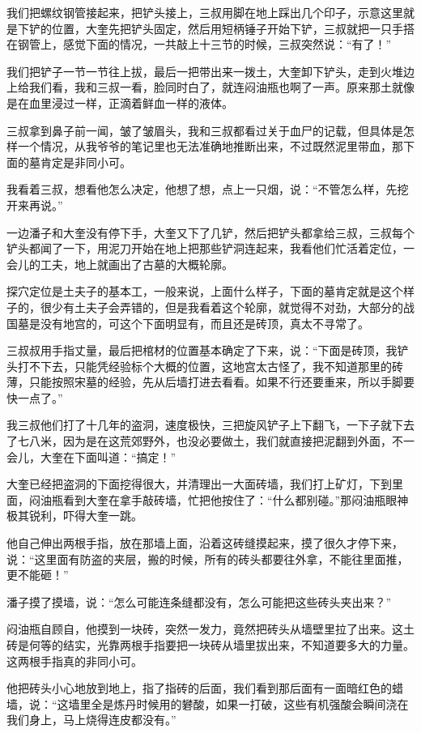 我们把螺纹钢管接起来，把铲头接上，三叔用脚在地上踩出几个印子，示意这里就是下铲的位置，大奎先把铲头固定，然后用短柄锤子开始下铲，三叔就把一只手搭在钢管上，感觉下面的情况，一共敲上十三节的时候，三叔突然说：“有了！”

我们把铲子一节一节往上拔，最后一把带出来一拨土，大奎卸下铲头，走到火堆边上给我们看，我和三叔一看，脸同时白了，就连闷油瓶也啊了一声。原来那土就像是在血里浸过一样，正滴着鲜血一样的液体。

三叔拿到鼻子前一闻，皱了皱眉头，我和三叔都看过关于血尸的记载，但具体是怎样一个情况，从我爷爷的笔记里也无法准确地推断出来，不过既然泥里带血，那下面的墓肯定是非同小可。

我看着三叔，想看他怎么决定，他想了想，点上一只烟，说：“不管怎么样，先挖开来再说。”

一边潘子和大奎没有停下手，大奎又下了几铲，然后把铲头都拿给三叔，三叔每个铲头都闻了一下，用泥刀开始在地上把那些铲洞连起来，我看他们忙活着定位，一会儿的工夫，地上就画出了古墓的大概轮廓。

探穴定位是土夫子的基本工，一般来说，上面什么样子，下面的墓肯定就是这个样子的，很少有土夫子会弄错的，但是我看着这个轮廓，就觉得不对劲，大部分的战国墓是没有地宫的，可这个下面明显有，而且还是砖顶，真太不寻常了。

三叔叔用手指丈量，最后把棺材的位置基本确定了下来，说：“下面是砖顶，我铲头打不下去，只能凭经验标个大概的位置，这地宫太古怪了，我不知道那里的砖薄，只能按照宋墓的经验，先从后墙打进去看看。如果不行还要重来，所以手脚要快一点了。”

我三叔他们打了十几年的盗洞，速度极快，三把旋风铲子上下翻飞，一下子就下去了七八米，因为是在这荒郊野外，也没必要做土，我们就直接把泥翻到外面，不一会儿，大奎在下面叫道：“搞定！”

大奎已经把盗洞的下面挖得很大，并清理出一大面砖墙，我们打上矿灯，下到里面，闷油瓶看到大奎在拿手敲砖墙，忙把他按住了：“什么都别碰。”那闷油瓶眼神极其锐利，吓得大奎一跳。

他自己伸出两根手指，放在那墙上面，沿着这砖缝摸起来，摸了很久才停下来，说：“这里面有防盗的夹层，搬的时候，所有的砖头都要往外拿，不能往里面推，更不能砸！”

潘子摸了摸墙，说：“怎么可能连条缝都没有，怎么可能把这些砖头夹出来？”

闷油瓶自顾自，他摸到一块砖，突然一发力，竟然把砖头从墙壁里拉了出来。这土砖是何等的结实，光靠两根手指要把一块砖从墙里拔出来，不知道要多大的力量。这两根手指真的非同小可。

他把砖头小心地放到地上，指了指砖的后面，我们看到那后面有一面暗红色的蜡墙，说：“这墙里全是炼丹时候用的礬酸，如果一打破，这些有机强酸会瞬间浇在我们身上，马上烧得连皮都没有。”

